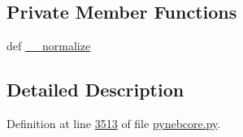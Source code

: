 \subsection*{Private Member Functions}
\begin{DoxyCompactItemize}
\item 
def \hyperlink{classpyneb_1_1core_1_1pynebcore_1_1_observation_a04ce20073b375a6dd7d4282933adbd93}{\-\_\-\-\_\-normalize}
\end{DoxyCompactItemize}


\subsection{Detailed Description}


Definition at line \hyperlink{pynebcore_8py_source_l03513}{3513} of file \hyperlink{pynebcore_8py_source}{pynebcore.\-py}.



